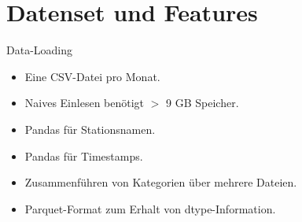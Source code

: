 \section{Datenset und Features}

\begin{frame}{Data-Loading}
{
\begin{itemize}
\item Eine CSV-Datei pro Monat.
\item Naives Einlesen benötigt $>$ 9 GB Speicher.
\end{itemize}
}
{
\begin{itemize}
\item Pandas  für Stationsnamen.
\item Pandas  für Timestamps.
\item Zusammenführen von Kategorien über mehrere Dateien.
\item Parquet-Format zum Erhalt von dtype-Information.
\end{itemize}
}
\end{frame}


